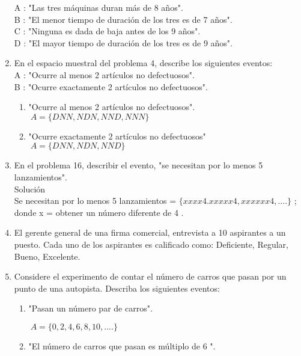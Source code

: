 \documentclass[12pt]{article}
\begin{document}
\begin{enumerate}
\begin{enumerate}[(a)]
\begin{enumerate}[A: ]
\end{enumerate}
\end{enumerate}
A : "Las tres máquinas duran más de 8 años".\\
B : "El menor tiempo de duración de los tres es de 7 años".\\
C : "Ninguna es dada de baja antes de los 9 años".\\
D : "El mayor tiempo de duración de los tres es de 9 años".
\item En el espacio muestral del problema 4, describe los siguientes eventos:\\
A : "Ocurre al menos 2 artículos no defectuosos".\\
B : "Ocurre exactamente 2 artículos no defectuosos".\\
\begin{enumerate}[A: ]

\item "Ocurre al menos 2 artículos no defectuosos".\\[0.2cm]

$\ A=\lbrace DNN,NDN,NND,NNN\rbrace$

\item "Ocurre exactamente 2 artículos no defectuosos"\\
$\ A=\lbrace DNN,NDN,NND\rbrace$

\end{enumerate}
\item En el problema 16, describir el evento, "se necesitan por lo menos 5 lanzamientos".\\
Solución\\
Se necesitan por lo menos 5 lanzamientos = $\lbrace xxxx4.xxxxx4,xxxxxx4,....\rbrace$ ; donde x = obtener un número diferente de 4 .
\item El gerente general de una firma comercial, entrevista a 10 aspirantes a
un puesto. Cada uno de los aspirantes es calificado como: Deficiente, Regular, Bueno, Excelente.

\item Considere el experimento de contar el número de carros que pasan por un
punto de una autopista. Describa los siguientes eventos:

\begin{enumerate}[A; ]

\item "Pasan un número par de carros".

$\ A=\lbrace0,2,4,6,8,10,....\rbrace$

\item "El número de carros que pasan es múltiplo de 6 ".


\end{enumerate}
\end{enumerate}
\end{document}
